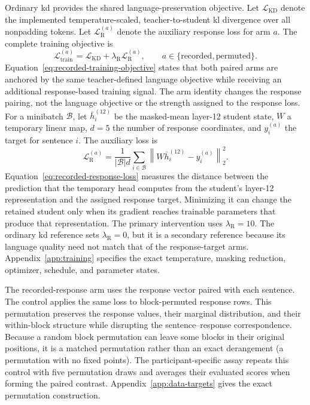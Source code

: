 Ordinary \ac{kd} provides the shared language-preservation objective.
Let \(\mathcal L_{\mathrm{KD}}\) denote the implemented temperature-scaled, teacher-to-student \ac{kl} divergence over all nonpadding tokens.
Let \(\mathcal L_{\mathrm{R}}^{(a)}\) denote the auxiliary response loss for arm \(a\).
The complete training objective is
\begin{equation}
\mathcal L_{\mathrm{train}}^{(a)}
=
\mathcal L_{\mathrm{KD}}
+
\lambda_{\mathrm{R}}\mathcal L_{\mathrm{R}}^{(a)},
\qquad
a\in\{\mathrm{recorded},\mathrm{permuted}\}.
\label{eq:recorded-training-objective}
\end{equation}
Equation~\ref{eq:recorded-training-objective} states that both paired arms are anchored by the same teacher-defined language objective while receiving an additional response-based training signal.
The arm identity changes the response pairing, not the language objective or the strength assigned to the response loss.
For a minibatch \(\mathcal B\), let \(\bar h_i^{(12)}\) be the masked-mean layer-12 student state, \(W\) a temporary linear map, \(d=5\) the number of response coordinates, and \(y_i^{(a)}\) the target for sentence \(i\).
The auxiliary loss is
\begin{equation}
\mathcal L_{\mathrm{R}}^{(a)}
=
\frac{1}{|\mathcal B|d}
\sum_{i\in\mathcal B}
\left\|
W\bar h_i^{(12)}-y_i^{(a)}
\right\|_2^2.
\label{eq:recorded-response-loss}
\end{equation}
Equation~\ref{eq:recorded-response-loss} measures the distance between the prediction that the temporary head computes from the student's layer-12 representation and the assigned response target.
Minimizing it can change the retained student only when its gradient reaches trainable parameters that produce that representation.
The primary intervention uses \(\lambda_{\mathrm{R}}=10\).
The ordinary \ac{kd} reference sets \(\lambda_{\mathrm{R}}=0\), but it is a secondary reference because its language quality need not match that of the response-target arms.
Appendix~\ref{app:training} specifies the exact temperature, masking reduction, optimizer, schedule, and parameter states.

The recorded-response arm uses the response vector paired with each sentence.
The control applies the same loss to block-permuted response rows.
This permutation preserves the response values, their marginal distribution, and their within-block structure while disrupting the sentence--response correspondence.
Because a random block permutation can leave some blocks in their original positions, it is a matched permutation rather than an exact derangement (a permutation with no fixed points).
The participant-specific assay repeats this control with five permutation draws and averages their evaluated scores when forming the paired contrast.
Appendix~\ref{app:data-targets} gives the exact permutation construction.

